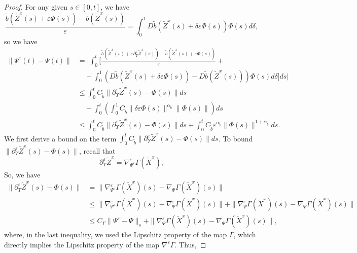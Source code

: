 \documentclass[11pt]{article}
\theoremstyle{definition}
\theoremstyle{plain}
\newcommand{\tb}{\tilde{b}}
\newcommand{\veps}{\varepsilon}
\begin{document}
\begin{appendices}
\begin{proof}
For any given \( s \in [0,t] \), we have
\[
\frac{\tb(\tilde{Z}^x(s) + \varepsilon \Phi(s)) - \tb(\tilde{Z}^x(s))}{\varepsilon}
= \int_0^1 D\tb(\tilde{Z}^x(s) + \delta \varepsilon \Phi(s)) \Phi(s) d\delta,
\]
so we have
\begin{align*}
\| \Psi^\varepsilon(t) - \Psi(t) \| 
& = \Bigg|\int_0^t \Bigg[ \frac{\tb(\tilde{Z}^x(s) + \varepsilon \partial_\Upsilon^\varepsilon \tilde{Z}^x(s)) - \tb(\tilde{Z}^x(s)+ \varepsilon \Phi(s))}{\varepsilon} +  \\
& \quad + \int_0^1 \left( D\tb(\tilde{Z}^x(s) + \delta \varepsilon \Phi(s)) - D\tb(\tilde{Z}^x(s)) \right) \Phi(s) d\delta \Bigg] ds \Bigg| \\
& \le \int_0^t C_{\tb} \| \partial_\Upsilon^\varepsilon \tilde{Z}^x(s) - \Phi(s) \| ds \\
& \quad + \int_0^t \left(\int_0^1 C_{\tb} \|\delta \veps \Phi(s)\|^{\alpha_{\tb}} \|\Phi(s)\|\right) ds \\
& \le \int_0^t C_{\tb} \| \partial_\Upsilon^\varepsilon \tilde{Z}^x(s) - \Phi(s) \| ds
+ \int_0^t C_{\tb} \veps^{\alpha_{\tb}} \| \Phi(s) \|^{1 + {\alpha_{\tb}}} ds.
\end{align*}
We first derive a bound on the term $\int_0^t C_{\tb} \| \partial_\Upsilon^\varepsilon \tilde{Z}^x(s) - \Phi(s) \| ds$. 
To bound \( \| \partial_\Upsilon^\varepsilon \tilde{Z}^x(s) - \Phi(s) \| \), recall that
\[
\partial_\Upsilon^\varepsilon \tilde{Z}^x = \nabla^\veps_{\Psi^\varepsilon} \Gamma(\tilde{X}^x),
\]
So, we have
\begin{align*}
\| \partial_\Upsilon^\varepsilon \tilde{Z}^x(s) - \Phi(s) \|
&= \| \nabla^\veps_{\Psi^\varepsilon} \Gamma(\tilde{X}^x)(s) - \nabla_{\Psi} \Gamma(\tilde{X}^x)(s) \| \\
&\le \| \nabla^\veps_{\Psi^\varepsilon} \Gamma(\tilde{X}^x)(s) - \nabla^\veps_{\Psi} \Gamma(\tilde{X}^x)(s) \| 
+ \| \nabla^\veps_{\Psi} \Gamma(\tilde{X}^x)(s) - \nabla_{\Psi} \Gamma(\tilde{X}^x)(s) \| \\
&\le C_\Gamma \| \Psi^\varepsilon - \Psi \|_s + \| \nabla^\veps_{\Psi} \Gamma(\tilde{X}^x)(s) - \nabla_{\Psi} \Gamma(\tilde{X}^x)(s) \|, 
\end{align*}
where, in the last inequality, we used the Lipschitz property of the map $\Gamma$, 
which directly implies the Lipschitz property of the map $\nabla^\veps \Gamma$. Thus, 

\end{proof}
\end{appendices}
\end{document}
